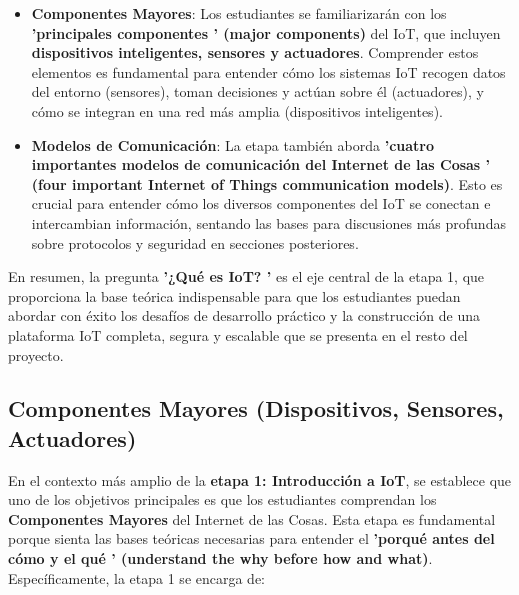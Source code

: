 \documentclass{report}
\begin{document}
\begin{itemize}
    \item \textbf{Componentes Mayores}: Los estudiantes se familiarizarán con los \textbf{ 'principales componentes ' (major components)} del IoT, que 
    incluyen \textbf{dispositivos inteligentes, sensores y actuadores}. Comprender estos elementos es fundamental para entender cómo los sistemas IoT 
    recogen datos del entorno (sensores), toman decisiones y actúan sobre él (actuadores), y cómo se integran en una red más amplia (dispositivos inteligentes).
    \item \textbf{Modelos de Comunicación}: La etapa también aborda \textbf{ 'cuatro importantes modelos de comunicación del Internet de las Cosas ' 
    (four important Internet of Things communication models)}. Esto es crucial para entender cómo los diversos componentes del IoT se conectan e intercambian 
    información, sentando las bases para discusiones más profundas sobre protocolos y seguridad en secciones posteriores.
\end{itemize}
En resumen, la pregunta \textbf{ '¿Qué es IoT? '} es el eje central de la etapa 1, que proporciona la base teórica indispensable para que los estudiantes 
puedan abordar con éxito los desafíos de desarrollo práctico y la construcción de una plataforma IoT completa, segura y escalable que se presenta en el 
resto del proyecto.

\subsection{Componentes Mayores (Dispositivos, Sensores, Actuadores)}
En el contexto más amplio de la \textbf{etapa 1: Introducción a IoT}, se  establece que uno de los objetivos principales es que los estudiantes 
comprendan los \textbf{Componentes Mayores} del Internet de las Cosas. Esta etapa es fundamental porque sienta las bases teóricas necesarias para entender 
el \textbf{ 'porqué antes del cómo y el qué ' (understand the why before how and what)}. Específicamente, la etapa 1 se encarga de:
\end{document}
